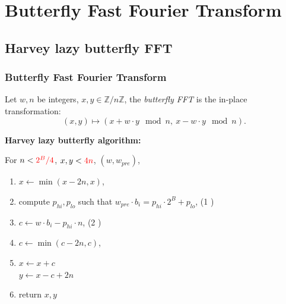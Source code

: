 \documentclass[10pt]{beamer}
\begin{document}
\section{Butterfly Fast Fourier Transform}
\subsection{Harvey lazy butterfly FFT}
\begin{frame}
    \frametitle{Butterfly Fast Fourier Transform}
    \begin{mybox}
    Let $w, n$ be integers, $x,y \in \mathbb{Z}/n\mathbb{Z}$, 
    the \textit{butterfly FFT} is the in-place transformation: 
    \[
    (x,y) \mapsto (x + w\cdot y \mod n,\ x - w\cdot y \mod n).
    \]
    \end{mybox}
    
    \bigskip
    \textbf{Harvey lazy butterfly algorithm\cite{DBLP:journals/corr/abs-1205-2926}:}

    \medskip
    For $n < \textcolor{red}{2^B /4}$, $x,y < \textcolor{red}{4n}$, $(w, w_{pre})$,
    \begin{enumerate}
        \item $x \gets \min(x-2n, x)$,
        \item compute $p_{hi}, p_{lo}$ such that $w_{pre} \cdot b_i = p_{hi}\cdot 2^B + p_{lo}$, \hfill (1 )
        \item $c \gets w\cdot b_i - p_{hi}\cdot n$, \hfill (2 )
        \item $c \gets \min(c-2n, c)$,
        \item $x\gets x + c$ \\
            $y \gets x - c + 2n$
        \item return $x,y$
    \end{enumerate}

\end{frame}
\end{document}
